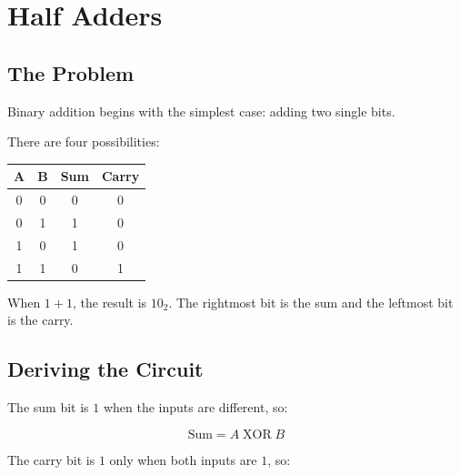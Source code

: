 \chapter{Half Adders}
\label{chap:half-adders}



\section{The Problem}

Binary addition begins with the simplest case: adding two single bits.

There are four possibilities:

\begin{center}
\begin{tabular}{cccc}
\toprule
A & B & Sum & Carry \\
\midrule
0 & 0 & 0 & 0 \\
0 & 1 & 1 & 0 \\
1 & 0 & 1 & 0 \\
1 & 1 & 0 & 1 \\
\bottomrule
\end{tabular}
\end{center}

When \(1+1\), the result is \(10_2\). The rightmost bit is the sum and the leftmost bit is the carry.

\section{Deriving the Circuit}

The sum bit is \(1\) when the inputs are different, so:

\[
\text{Sum}=A\operatorname{XOR}B
\]

The carry bit is \(1\) only when both inputs are \(1\), so:

